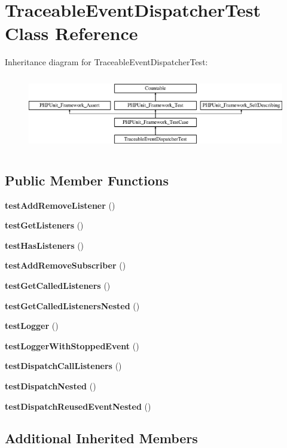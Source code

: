 \section{Traceable\+Event\+Dispatcher\+Test Class Reference}
\label{class_symfony_1_1_component_1_1_event_dispatcher_1_1_tests_1_1_debug_1_1_traceable_event_dispatcher_test}
Inheritance diagram for Traceable\+Event\+Dispatcher\+Test\+:\begin{figure}[H]
\begin{center}
\leavevmode
\includegraphics[height=3.303835cm]{class_symfony_1_1_component_1_1_event_dispatcher_1_1_tests_1_1_debug_1_1_traceable_event_dispatcher_test}
\end{center}
\end{figure}
\subsection*{Public Member Functions}
\begin{DoxyCompactItemize}
\item 
{\bf test\+Add\+Remove\+Listener} ()
\item 
{\bf test\+Get\+Listeners} ()
\item 
{\bf test\+Has\+Listeners} ()
\item 
{\bf test\+Add\+Remove\+Subscriber} ()
\item 
{\bf test\+Get\+Called\+Listeners} ()
\item 
{\bf test\+Get\+Called\+Listeners\+Nested} ()
\item 
{\bf test\+Logger} ()
\item 
{\bf test\+Logger\+With\+Stopped\+Event} ()
\item 
{\bf test\+Dispatch\+Call\+Listeners} ()
\item 
{\bf test\+Dispatch\+Nested} ()
\item 
{\bf test\+Dispatch\+Reused\+Event\+Nested} ()
\end{DoxyCompactItemize}
\subsection*{Additional Inherited Members}


